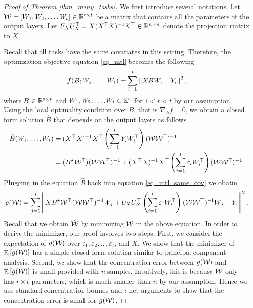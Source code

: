 \begin{proof}[Proof of Theorem \ref{thm_many_tasks}]
	We first introduce several notations.
	Let $\mathcal W = [W_1, W_2, \dots, W_t] \in \mathbb{R}^{r\times t}$ be a matrix that contains all the parameters of the output layers.
	Let $U_X U_X^{\top} = X (X^{\top} X)^{-1} X^{\top} \in\mathbb{R}^{n \times n}$ denote the projection matrix to $X$.

	Recall that all tasks have the same covariates in this setting.
	Therefore, the optimization objective equation \eqref{eq_mtl} becomes the following
	\begin{align}
		f(B; W_1, \dots, W_t) = \sum_{i=1}^t \left\| X B W_i - Y_i \right\|^2, \label{eq_mtl_same_cov}
	\end{align}
	where $B \in \mathbb{R}^{p \times r}$ and $W_1, W_2, \dots, W_t \in \mathbb{R}^r$ for $1 < r < t$ by our assumption.
	Using the local optimality condition over $B$, that is $\nabla_B f = 0$, we obtain a closed form solution $\hat{B}$ that depends on the output layers as follows
	\begin{align*}
		\hat{B}(W_1, \dots, W_t) &= (X^{\top}X)^{-1} X^{\top} \left({\sum_{i=1}^t Y_i W_i^{\top}}\right) (\mathcal W  \mathcal W^{\top})^{-1} \\
		&= (B^\star \mathcal W ^{\top}) (\mathcal W \mathcal W ^{\top})^{-1} + (X^{\top}X)^{-1}X^{\top}   \left({\sum_{i=1}^t \varepsilon_i W_i^{\top}}\right) (\mathcal W \mathcal W^{\top})^{-1}.
	\end{align*}
	Plugging in the equation $\hat{B}$ back into equation \eqref{eq_mtl_same_cov} we obatin
	\begin{align}
		g(\mathcal W) = \sum_{j=1}^t \left\| X B^{\star} {\mathcal W}^{\top} ({\mathcal W}{\mathcal W}^{\top})^{-1} W_j + U_X U_X^{\top} \left({\sum_{i=1}^t \varepsilon_i W_i^{\top}}\right) ({\mathcal W}{\mathcal W}^{\top})^{-1} W_j - Y_i \right\|^2. \label{eq_mtl_output_layer}
	\end{align}
	Recall that we obtain $\hat{{\mathcal W}}$ by minimizing ${\mathcal W}$ in the above equation.
	In order to derive the minimizer, our proof involves two steps.
	First, we consider the expectation of $g({\mathcal W})$ over $\varepsilon_1, \varepsilon_2, \dots, \varepsilon_t$, and $X$.
	We show that the minimizer of $\mathop{\mathbb{E}}\left[ g({\mathcal W}) \right]$ has a simple closed form solution similar to principal component analysis.
	Second, we show that the concentration error between $g({\mathcal W})$ and $\mathop{\mathbb{E}}\left[ g({\mathcal W}) \right]$ is small provided with $n$ samples.
	Intuitively, this is because ${\mathcal W}$ only has $r \times t$ parameters, which is much smaller than $n$ by our assumption.
	Hence we use standard concentration bounds and $\epsilon$-net arguments to show that the concentration error is small for $g({\mathcal W})$.

\end{proof}
